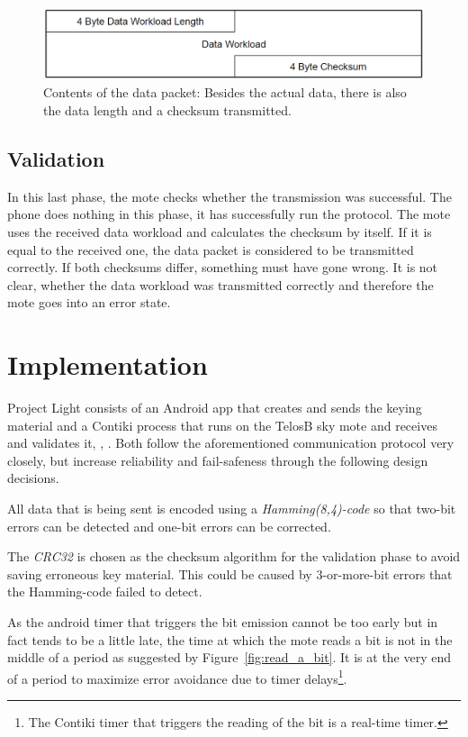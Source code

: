 \documentclass{sig-alternate} %
\begin{document}
\begin{figure}
	\centering
	\includegraphics[scale=.3]{images/data_packet.png}
	\caption{Contents of the data packet: Besides the actual data, there is also the data length and a checksum transmitted.}
	\label{fig:data_packet}
\end{figure}

\subsection{Validation}
\label{sub:validation}

In this last phase, the mote checks whether the transmission was successful.
The phone does nothing in this phase, it has successfully run the protocol.
The mote uses the received data workload and calculates the checksum by itself.
If it is equal to the received one, the data packet is considered to be transmitted correctly.
If both checksums differ, something must have gone wrong.
It is not clear, whether the data workload was transmitted correctly and therefore the mote goes into an error state.

\section{Implementation}
\label{sec:implementation}

Project Light consists of an Android app that creates and sends the keying material and a Contiki process that runs on the TelosB sky mote and receives and validates it, \cite{dunkels04contiki}, \cite{telosb}.
Both follow the aforementioned communication protocol very closely, but increase reliability and fail-safeness through the following design decisions.

All data that is being sent is encoded using a \textit{Hamming(8,4)-code} so that two-bit errors can be detected and one-bit errors can be corrected.

The \textit{CRC32} is chosen as the checksum algorithm for the validation phase to avoid saving erroneous key material.
This could be caused by 3-or-more-bit errors that the Hamming-code failed to detect.

As the android timer that triggers the bit emission cannot be too early but in fact tends to be a little late\cite{mongia2010reliable}, the time at which the mote reads a bit is not in the middle of a period as suggested by Figure~\ref{fig:read_a_bit}.
It is at the very end of a period to maximize error avoidance due to timer delays\footnote{The Contiki timer that triggers the reading of the bit is a real-time timer.}.
\end{document}
